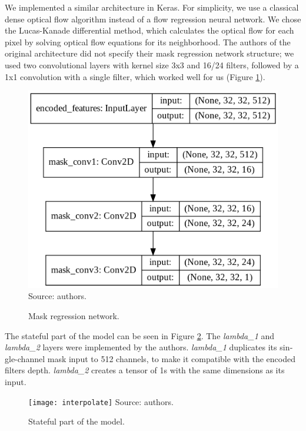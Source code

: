 \documentclass[12pt,openright,oneside,a4paper,english, brazilian]{abntex2}
\begin{document}
\begin{otherlanguage}{english}
We implemented a similar architecture in Keras. For simplicity, we use a classical dense optical flow algorithm instead of a flow regression neural network. We chose the Lucas-Kanade differential method, which calculates the optical flow for each pixel by solving optical flow equations for its neighborhood. The authors of the original architecture did not specify their mask regression network structure; we used two convolutional layers with kernel size 3x3 and 16/24 filters, followed by a 1x1 convolution with a single filter, which worked well for us (Figure \ref{mask_net}).

\begin{figure}[!htb]
\centering
\caption{Mask regression network.}
\includegraphics[width=\textwidth/2]{mask_network}\\
Source: authors.
\label{mask_net}
\end{figure}

The stateful part of the model can be seen in Figure \ref{stateful_net}. The \textit{lambda\_1} and \textit{lambda\_2} layers were implemented by the authors. \textit{lambda\_1} duplicates its single-channel mask input to 512 channels, to make it compatible with the encoded filters depth. \textit{lambda\_2} creates a tensor of 1s with the same dimensions as its input.

\begin{figure}[!htb]
\centering
\caption{Stateful part of the model.}
\texttt{[image: interpolate]}
Source: authors.
\label{stateful_net}
\end{figure}


\end{otherlanguage}
\end{document}
